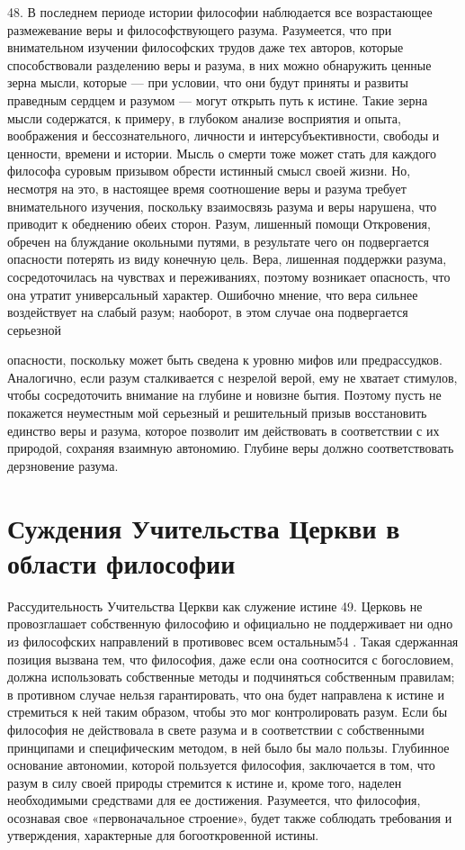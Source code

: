 \documentclass[a5paper,10pt]{article}
\begin{document}
48. В последнем периоде истории философии наблюдается все возрастающее
размежевание веры и философствующего разума. Разумеется, что при внимательном
изучении философских трудов даже тех авторов, которые способствовали разделению
веры и разума, в них можно обнаружить ценные зерна мысли, которые — при
условии, что они будут приняты и развиты праведным сердцем и разумом — могут
открыть путь к истине. Такие зерна мысли содержатся, к примеру, в глубоком
анализе восприятия и опыта, воображения и бессознательного, личности и
интерсубъективности, свободы и ценности, времени и истории. Мысль о смерти тоже
может стать для каждого философа суровым призывом обрести истинный смысл своей
жизни. Но, несмотря на это, в настоящее время соотношение веры и разума требует
внимательного изучения, поскольку взаимосвязь разума и веры нарушена, что
приводит к обеднению обеих сторон. Разум, лишенный помощи Откровения, обречен
на блуждание окольными путями, в результате чего он подвергается опасности
потерять из виду конечную цель. Вера, лишенная поддержки разума,
сосредоточилась на чувствах и переживаниях, поэтому возникает опасность, что
она утратит универсальный характер. Ошибочно мнение, что вера сильнее
воздействует на слабый разум; наоборот, в этом случае она подвергается
серьезной

опасности, поскольку может быть сведена к уровню мифов или предрассудков.
Аналогично, если разум сталкивается с незрелой верой, ему не хватает стимулов,
чтобы сосредоточить внимание на глубине и новизне бытия. Поэтому пусть не
покажется неуместным мой серьезный и решительный призыв восстановить единство
веры и разума, которое позволит им действовать в соответствии с их природой,
сохраняя взаимную автономию. Глубине веры должно соответствовать дерзновение
разума.

\section{Суждения Учительства Церкви в области философии}

Рассудительность Учительства Церкви как служение истине 49. Церковь не
провозглашает собственную философию и официально не поддерживает ни одно из
философских направлений в противовес всем остальным54 . Такая сдержанная
позиция вызвана тем, что философия, даже если она соотносится с богословием,
должна использовать собственные методы и подчиняться собственным правилам; в
противном случае нельзя гарантировать, что она будет направлена к истине и
стремиться к ней таким образом, чтобы это мог контролировать разум. Если бы
философия не действовала в свете разума и в соответствии с собственными
принципами и специфическим методом, в ней было бы мало пользы. Глубинное
основание автономии, которой пользуется философия, заключается в том, что разум
в силу своей природы стремится к истине и, кроме того, наделен необходимыми
средствами для ее достижения. Разумеется, что философия, осознавая свое
«первоначальное строение», будет также соблюдать требования и утверждения,
характерные для богооткровенной истины.
\end{document}
